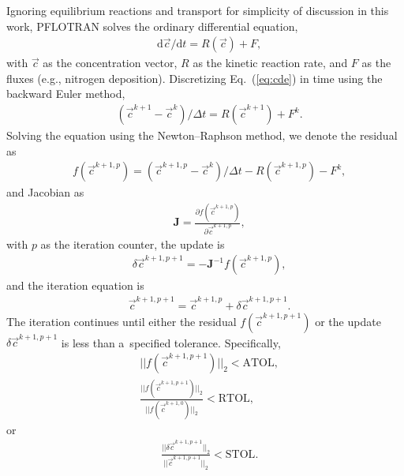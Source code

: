 \documentclass[gmdd, online, hvmath]{copernicus}
\begin{document}
      Ignoring equilibrium reactions and transport for simplicity of
      discussion in this work, PFLOTRAN solves the ordinary differential
      equation,
\begin{align}
 &
\label{eq:cde}
{\mathrm{d} \vec{c}}/{\mathrm{d} t} = {R}(\vec{c}) + {F},
\end{align}%
      with $\vec{c}$ as the concentration vector, ${R}$ as the kinetic
      reaction rate, and ${F}$ as the fluxes (e.g., nitrogen
      deposition). Discretizing Eq.~(\ref{eq:cde}) in time using the
      backward Euler method,
\begin{align}
 &
{(\vec{c}^{k+1} - \vec{c}^k)}/{\Delta t} = {R}(\vec{c}^{k+1}) + {F}^k.
\label{eq:cdedis}
\end{align}%
      Solving the equation using the Newton--Raphson method, we denote the
      residual as
\begin{align}
 &
{f}(\vec{c}^{k+1,p})=(\vec{c}^{k+1,p}-\vec{c}^k)/\Delta t-{R}(\vec{c}^{k+1,p})-{F}^k,
\label{eq:residual}
\end{align}%
      and Jacobian as
\begin{align}
 &
\mathbf{J} = \frac{\partial {f}(\vec{c}^{k+1,p})}{\partial \vec{c}^{k+1,p}},
\label{eq:jacobian}
\end{align}%
      with $p$ as the iteration counter, the update is
\begin{align}
 &
\delta \vec{c}^{k+1,p+1}= -\mathbf{J}^{-1} {f} (\vec{c}^{k+1,p}),
\label{eq:axb}
\end{align}%
      and the iteration equation is
\begin{align}
 &
\vec{c}^{k+1,p+1}=\vec{c}^{k+1,p}+\delta \vec{c}^{k+1,p+1}.
\label{eq:update}
\end{align}%
      The iteration continues until either the residual
      ${f}(\vec{c}^{k+1,p+1})$ or the update $\delta \vec{c}^{k+1,p+1}$ is
      less than a~specified tolerance. Specifically,
\begin{align}
 &
\vert\vert {f}(\vec{c}^{k+1,p+1}) \vert\vert _2 < \text{ATOL},
\label{eq:atol}
\\
&
\frac{\vert\vert {f}(\vec{c}^{k+1,p+1})\vert\vert _2}{\vert\vert {f}(\vec{c}^{k+1,0})\vert\vert _2} < \text{RTOL},
\label{eq:rtol}
\end{align}%
      or
\begin{align}
 &
\frac{\vert\vert \delta \vec{c}^{k+1,p+1} \vert\vert _2}{\vert\vert \vec{c}^{k+1,p+1} \vert\vert _2} < \text{STOL}.
\label{eq:stol}
\end{align}%
\end{document}
